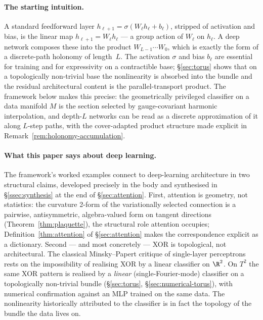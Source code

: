 \paragraph{The starting intuition.} A standard feedforward layer
$h_{\ell+1}=\sigma(W_\ell h_\ell + b_\ell)$, stripped of activation
and bias, is the linear map $h_{\ell+1}=W_\ell h_\ell$ --- a group
action of $W_\ell$ on $h_\ell$. A deep network composes these into
the product $W_{L-1}\cdots W_0$, which is exactly the form of a
discrete-path holonomy of length~$L$. The activation $\sigma$ and
bias $b_\ell$ are essential for training and for expressivity on a
contractible base; \S\ref{sec:torus} shows that on a topologically
non-trivial base the nonlinearity is absorbed into the bundle and
the residual architectural content is the parallel-transport
product. The framework below makes this precise: the geometrically
privileged classifier on a data manifold $M$ is the section selected
by gauge-covariant harmonic interpolation, and depth-$L$ networks
can be read as a discrete approximation of it along $L$-step paths,
with the cover-adapted product structure made explicit in
Remark~\ref{rem:holonomy-accumulation}.

\paragraph{What this paper says about deep learning.} The
framework's worked examples connect to deep-learning architecture
in two structural claims, developed precisely in the body and
synthesised in \S\ref{ssec:synthesis} at the end of \S\ref{sec:attention}.
First, attention is geometry, not statistics: the curvature 2-form
of the variationally selected connection is a pairwise,
antisymmetric, algebra-valued form on tangent directions
(Theorem~\ref{thm:plaquette}), the structural role attention
occupies; Definition~\ref{thm:attention} of \S\ref{sec:attention}
makes the correspondence explicit as a dictionary. Second --- and most concretely --- XOR is
topological, not architectural. The classical Minsky--Papert critique
of single-layer perceptrons rests on the impossibility of realising
XOR by a linear classifier on $\R^2$. On $T^2$ the same XOR pattern
is realised by a \emph{linear} (single-Fourier-mode) classifier on a
topologically non-trivial bundle (\S\ref{sec:torus},
\S\ref{sec:numerical-torus}), with numerical confirmation against an
MLP trained on the same data. The nonlinearity historically
attributed to the classifier is in fact the topology of the bundle
the data lives on.

